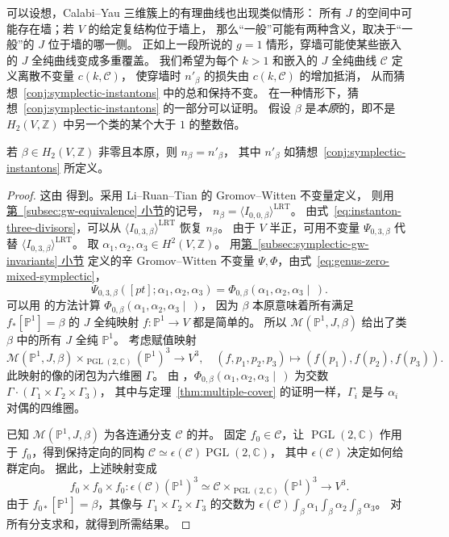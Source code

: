 可以设想，Calabi--Yau 三维簇上的有理曲线也出现类似情形：
所有 $J$ 的空间中可能存在墙；若 $V$ 的给定复结构位于墙上，
那么“一般”可能有两种含义，取决于“一般”的 $J$ 位于墙的哪一侧。
正如上一段所说的 $g=1$ 情形，穿墙可能使某些嵌入的 $J$ 全纯曲线变成多重覆盖。
我们希望为每个 $k>1$ 和嵌入的 $J$ 全纯曲线 $\mathcal C$ 定义离散不变量 $c(k,\mathcal C)$，
使穿墙时 $n'_\beta$ 的损失由 $c(k,\mathcal C)$ 的增加抵消，
从而猜想~\ref{conj:symplectic-instantons} 中的总和保持不变。
在一种情形下，猜想~\ref{conj:symplectic-instantons} 的一部分可以证明。
假设 $\beta$ 是\emph{本原}的，即不是 $H_2(V,\mathbb Z)$ 中另一个类的某个大于 $1$ 的整数倍。
\begin{proposition}\label{prop:primitive-instantons}
若 $\beta\in H_2(V,\mathbb Z)$ 非零且本原，则 $n_\beta=n'_\beta$，
其中 $n'_\beta$ 如猜想~\ref{conj:symplectic-instantons} 所定义。
\end{proposition}
\begin{proof}
这由  得到。采用 Li--Ruan--Tian 的 Gromov--Witten 不变量定义，
则用\hyperref[subsec:gw-equivalence]{第~\ref*{subsec:gw-equivalence} 小节}的记号，
$n_\beta=\langle I_{0,0,\beta}\rangle^{\mathrm{LRT}}$。
由式~\eqref{eq:instanton-three-divisors}，可以从 $\langle I_{0,3,\beta}\rangle^{\mathrm{LRT}}$ 恢复 $n_\beta$。
由于 $V$ 半正，可用不变量 $\Psi_{0,3,\beta}$ 代替 $\langle I_{0,3,\beta}\rangle^{\mathrm{LRT}}$。
取 $\alpha_1,\alpha_2,\alpha_3\in H^2(V,\mathbb Z)$。
用\hyperref[subsec:symplectic-gw-invariants]{第~\ref*{subsec:symplectic-gw-invariants} 小节}
定义的辛 Gromov--Witten 不变量 $\Psi,\Phi$，由式~\eqref{eq:genus-zero-mixed-symplectic}，
\[
\Psi_{0,3,\beta}([pt];\alpha_1,\alpha_2,\alpha_3)
=\Phi_{0,\beta}(\alpha_1,\alpha_2,\alpha_3\mid\,).
\]
可以用  的方法计算 $\Phi_{0,\beta}(\alpha_1,\alpha_2,\alpha_3\mid\,)$，
因为 $\beta$ 本原意味着所有满足 $f_*[\mathbb P^1]=\beta$ 的 $J$ 全纯映射 $f:\mathbb P^1\to V$ 都是简单的。
所以 $\mathcal M(\mathbb P^1,J,\beta)$ 给出了类 $\beta$ 中的所有 $J$ 全纯 $\mathbb P^1$。
考虑赋值映射
\[
\mathcal M(\mathbb P^1,J,\beta)\times_{\operatorname{PGL}(2,\mathbb C)}(\mathbb P^1)^3
\longrightarrow V^3,\quad(f,p_1,p_2,p_3)\longmapsto(f(p_1),f(p_2),f(p_3)).
\]
此映射的像的闭包为六维圈 $\Gamma$。
由 ，$\Phi_{0,\beta}(\alpha_1,\alpha_2,\alpha_3\mid\,)$
为交数 $\Gamma\cdot(\Gamma_1\times\Gamma_2\times\Gamma_3)$，
其中与定理~\ref{thm:multiple-cover} 的证明一样，$\Gamma_i$ 是与 $\alpha_i$ 对偶的四维圈。

已知 $\mathcal M(\mathbb P^1,J,\beta)$ 为各连通分支 $\mathcal C$ 的并。
固定 $f_0\in\mathcal C$，让 $\operatorname{PGL}(2,\mathbb C)$ 作用于 $f_0$，得到保持定向的同构
$\mathcal C\simeq\epsilon(\mathcal C)\operatorname{PGL}(2,\mathbb C)$，
其中 $\epsilon(\mathcal C)$ 决定如何给群定向。
据此，上述映射变成
\[
f_0\times f_0\times f_0:\epsilon(\mathcal C)(\mathbb P^1)^3
\simeq\mathcal C\times_{\operatorname{PGL}(2,\mathbb C)}(\mathbb P^1)^3\longrightarrow V^3.
\]
由于 $f_{0*}[\mathbb P^1]=\beta$，其像与 $\Gamma_1\times\Gamma_2\times\Gamma_3$ 的交数为
$\epsilon(\mathcal C)\int_\beta\alpha_1\int_\beta\alpha_2\int_\beta\alpha_3$。
对所有分支求和，就得到所需结果。
\end{proof}
